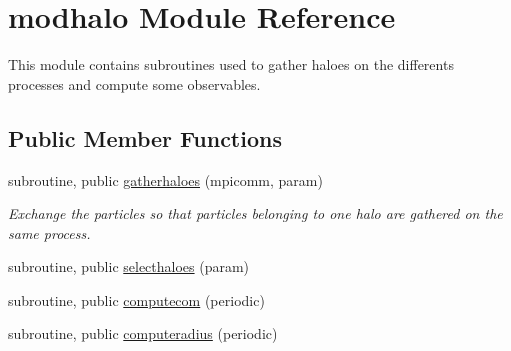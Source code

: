 \hypertarget{classmodhalo}{\section{modhalo Module Reference}
\label{classmodhalo}
}


This module contains subroutines used to gather haloes on the differents processes and compute some observables.  


\subsection*{Public Member Functions}
\begin{DoxyCompactItemize}
\item 
subroutine, public \hyperlink{classmodhalo_a1ffd35b4853d5d5c196678d253d43ae3}{gatherhaloes} (mpicomm, param)
\begin{DoxyCompactList}\small\item\em Exchange the particles so that particles belonging to one halo are gathered on the same process. \end{DoxyCompactList}\item 
subroutine, public \hyperlink{classmodhalo_ac468bdd056bc7c1db7e5338bce89ed5b}{selecthaloes} (param)
\item 
subroutine, public \hyperlink{classmodhalo_a2f8c1fd1c7fd4704ef7b80cbd4f6272a}{computecom} (periodic)
\item 
subroutine, public \hyperlink{classmodhalo_a891d00fd31e67d5669ac52117cf13034}{computeradius} (periodic)
\end{DoxyCompactItemize}
